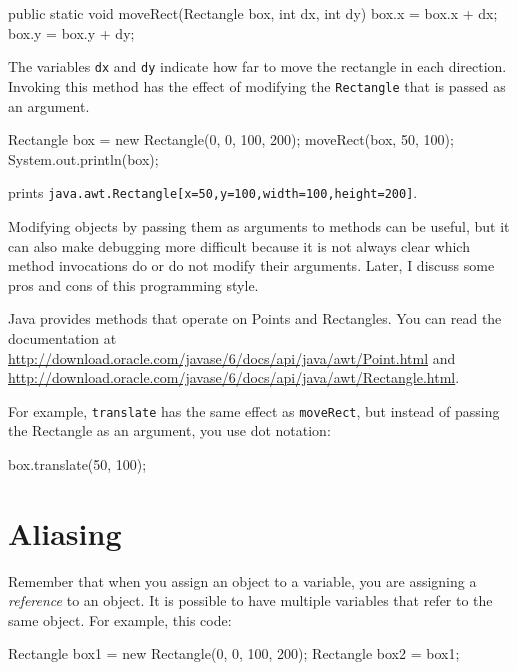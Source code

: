 \begin{code}
  public static void moveRect(Rectangle box, int dx, int dy) {
    box.x = box.x + dx;
    box.y = box.y + dy;
  }
\end{code}

The variables {\tt dx} and {\tt dy} indicate how far to move the
rectangle in each direction.  Invoking this method has the effect of
modifying the {\tt Rectangle} that is passed as an argument.

\begin{code}
    Rectangle box = new Rectangle(0, 0, 100, 200);
    moveRect(box, 50, 100);
    System.out.println(box);
\end{code}

prints {\tt java.awt.Rectangle[x=50,y=100,width=100,height=200]}.

Modifying objects by passing them as arguments to methods can be
useful, but it can also make debugging more difficult because it is
not always clear which method invocations do or do not modify their
arguments.  Later, I discuss some pros and cons of this
programming style.

Java provides methods that operate on Points and Rectangles.  You can
read the documentation at
\url{http://download.oracle.com/javase/6/docs/api/java/awt/Point.html}
and
\url{http://download.oracle.com/javase/6/docs/api/java/awt/Rectangle.html}.

For example, {\tt translate} has the same effect as {\tt moveRect},
but instead of passing the Rectangle as an argument, you use dot
notation:

\begin{code}
    box.translate(50, 100);
\end{code}



\section{Aliasing}
\label{aliasing}

Remember that when you assign an object to a variable, you
are assigning a {\em reference} to an object.  It is possible to have
multiple variables that refer to the same object.  For example,
this code:

\begin{code}
    Rectangle box1 = new Rectangle(0, 0, 100, 200);
    Rectangle box2 = box1;
\end{code}

